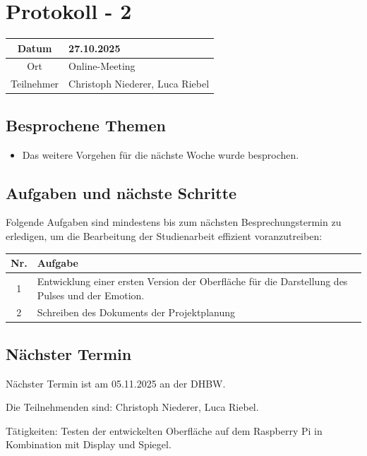 \chapter{Protokoll - 2}

\begin{table}[H]
    \centering
    \begin{tabular}{|c|l|}
        \hline
        Datum& 27.10.2025\\
        \hline
        Ort& Online-Meeting\\
        \hline
        Teilnehmer& Christoph Niederer, Luca Riebel\\
        \hline
    \end{tabular}
\end{table}

\section{Besprochene Themen}
\begin{itemize}
    \item Das weitere Vorgehen für die nächste Woche wurde besprochen.
\end{itemize}

\section{Aufgaben und nächste Schritte}
Folgende Aufgaben sind mindestens bis zum nächsten Besprechungstermin zu erledigen, um die Bearbeitung der Studienarbeit effizient voranzutreiben:

\begin{table}[H]
    \centering
    \begin{tabular}{|c|p{12cm}|}
        \hline
        \textbf{Nr.} & \textbf{Aufgabe}\\
        \hline
        1 & Entwicklung einer ersten Version der Oberfläche für die Darstellung des Pulses und der Emotion.\\
        \hline
        2 & Schreiben des Dokuments der Projektplanung\\
        \hline
    \end{tabular}
\end{table}

\section{Nächster Termin}
Nächster Termin ist am 05.11.2025 an der DHBW.

Die Teilnehmenden sind: Christoph Niederer, Luca Riebel. 

Tätigkeiten: Testen der entwickelten Oberfläche auf dem Raspberry Pi in Kombination mit Display und Spiegel.